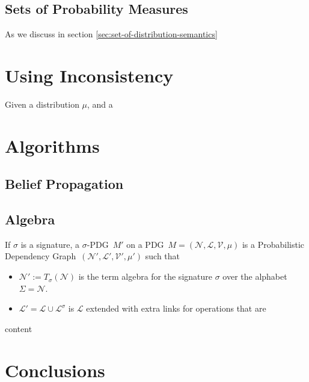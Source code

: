 \documentclass{article}
\newcommand{\modelname}{Probabilistic Dependency Graph}
\newcommand{\MN}{PDG}
\begin{document}
	\subsection{Sets of Probability Measures}
	As we discuss in section \ref{sec:set-of-distribution-semantics}



	\section{Using Inconsistency}

	Given a distribution $\mu$, and a

	\section{Algorithms}
	\subsection{Belief Propagation}


	\begin{vcat}
		\section{Algebra}\label{sec:algebra}
		\begin{defn}
			If $\sigma$ is a signature, a $\sigma$-\MN\ $M'$ on a \MN\ $M=(\mathcal N, \mathcal L, \mathcal V, \mu)$ is a \modelname\ $(\mathcal N', \mathcal L', \mathcal V', \mu')$ such that
			\begin{itemize}
				\item $\mathcal N':= T_\sigma(\mathcal N)$ is the term algebra for the signature $\sigma$ over the alphabet $\Sigma = \mathcal N$.
				\item $\mathcal L' = \mathcal L \cup \mathcal L^\sigma$ is $\mathcal L$ extended with extra links for operations that are 
			\end{itemize}
		\end{defn}
		
		\begin{example}
			content
		\end{example}
		
	\end{vcat}
	\section{Conclusions}
\end{document}
